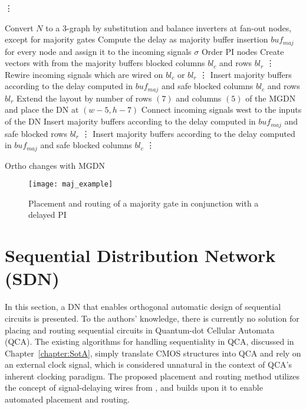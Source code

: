 \begin{algorithm}[H]
	\vdots
	
	\begin{algorithmic}
		\State Convert $N$ to a 3-graph by substitution and balance inverters at fan-out nodes, except for majority gates
		\State Compute the delay as majority buffer insertion $buf_{maj}$ for every node and assign it to the incoming signals $\sigma$
		\State Order PI nodes
		\State Create vectors with from the majority buffers blocked columns $bl_c$ and rows $bl_r$
		\State \vdots
		\State Rewire incoming signals which are wired on $bl_c$ or $bl_r$
		\State \vdots
		\EndIf
		\State Insert majority buffers according to the delay computed in $buf_{maj}$ and safe blocked columns $bl_c$ and rows $bl_r$
		\State Extend the layout by number of rows $(7)$ and columns $(5)$ of the MGDN and place the DN at $(w-5, h-7)$
		\State Connect incoming signals west to the inputs of the DN
		\State Insert majority buffers according to the delay computed in $buf_{maj}$ and safe blocked rows $bl_r$
		\State \vdots
		\State Insert majority buffers according to the delay computed in $buf_{maj}$ and safe blocked columns $bl_c$
		\State \vdots
		\EndIf
		
		\EndFor
	\end{algorithmic}
	\caption{Ortho changes with MGDN}\label{alg:majority_network}
\end{algorithm}

\begin{figure}
	\centering
	\texttt{[image: maj\_example]}
	\caption{Placement and routing of a majority gate in conjunction with a delayed PI}\label{fig:majority_with_buf}
\end{figure}


\section{Sequential Distribution Network (SDN)}
In this section, a DN that enables orthogonal automatic design of sequential circuits is presented. To the authors' knowledge, there is currently no solution for placing and routing sequential circuits in Quantum-dot Cellular Automata (QCA). The existing algorithms for handling sequentiality in QCA, discussed in Chapter~\ref{chapter:SotA}, simply translate CMOS structures into QCA and rely on an external clock signal, which is considered unnatural in the context of QCA's inherent clocking paradigm. The proposed placement and routing method utilizes the concept of signal-delaying wires from \cite{Walter}, and builds upon it to enable automated placement and routing.

